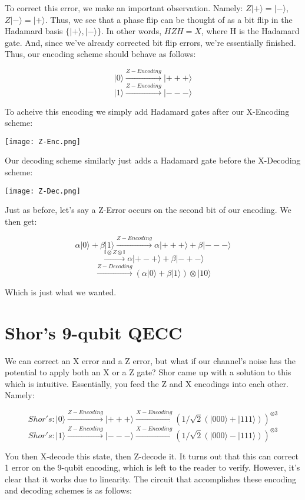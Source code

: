 \documentclass[11pt]{article}
\newcommand{\ket}[1]{\lvert #1 \rangle}
\begin{document}
To correct this error, we make an important observation. Namely: $Z\ket+ = \ket-$, $Z\ket- = \ket+$. Thus, we see that a phase flip can be thought of as a bit flip in the Hadamard basis $\{\ket+,\ket-\}$. In other words, $HZH = X$, where H is the Hadamard gate. And, since we've already corrected bit flip errors, we're essentially finished. Thus, our encoding scheme should behave as follows:

{
\[\ket0 \xrightarrow{Z-Encoding} \ket{+++} \]
\[\ket1 \xrightarrow{Z-Encoding} \ket{---} \]
}

To acheive this encoding we simply add Hadamard gates after our X-Encoding scheme:

{
\centering
\texttt{[image: Z-Enc.png]}
\label{fig:Grammar}
\par 
}

Our decoding scheme similarly just adds a Hadamard gate before the X-Decoding scheme:

{
\centering
\texttt{[image: Z-Dec.png]}
\label{fig:Grammar}
\par 
}

Just as before, let's say a Z-Error occurs on the second bit of our encoding. We then get:

{
\[\alpha\ket{0} +  \beta\ket{1} \xrightarrow{Z-Encoding} \alpha\ket{+++} +  \beta\ket{---}\]
\[ \xrightarrow{\mathbb{I} \otimes Z \otimes \mathbb{I} }\alpha\ket{+-+} +  \beta\ket{-+-}\]
\[\xrightarrow{Z-Decoding} (\alpha\ket{0} +  \beta\ket{1}) \otimes \ket{10}\]
}

Which is just what we wanted.

\section{Shor's 9-qubit QECC}

We can correct an X error and a Z error, but what if our channel's noise has the potential to apply both an X or a Z gate? Shor came up with a solution to this which is intuitive. Essentially, you feed the Z and X encodings into each other. Namely:

{
\[Shor's: \ket0 \xrightarrow{Z-Encoding} \ket{+++} \xrightarrow{X-Encoding} (1/\sqrt{2}(\ket{000} + \ket{111}))^{\otimes3} \]
\[Shor's: \ket1 \xrightarrow{Z-Encoding} \ket{---} \xrightarrow{X-Encoding} (1/\sqrt{2}(\ket{000} - \ket{111}))^{\otimes3} \]
}

You then X-decode this state, then Z-decode it. It turns out that this can correct 1 error on the 9-qubit encoding, which is left to the reader to verify. However, it's clear that it works due to linearity. The circuit that accomplishes these encoding and decoding schemes is as follows: 
\end{document}
